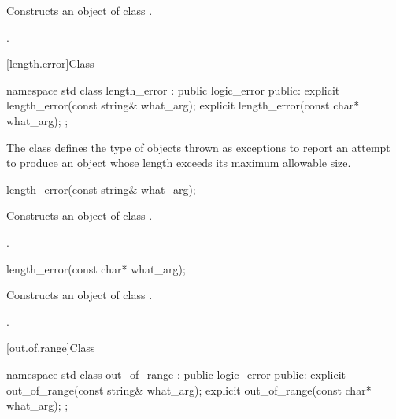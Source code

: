 \begin{itemdescr}
\pnum
\effects
Constructs an object of class
.

\pnum
\postcondition
{}.
\end{itemdescr}

[length.error]{Class }

%
\begin{codeblock}
namespace std {
  class length_error : public logic_error {
  public:
    explicit length_error(const string& what_arg);
    explicit length_error(const char* what_arg);
  };
}
\end{codeblock}

\pnum
The class
defines the type of objects thrown as exceptions
to report an attempt to produce
an object whose length exceeds its maximum allowable size.

%
\begin{itemdecl}
length_error(const string& what_arg);
\end{itemdecl}

\begin{itemdescr}
\pnum
\effects
Constructs an object of class
.

\pnum
\postcondition
{}.
\end{itemdescr}

%
\begin{itemdecl}
length_error(const char* what_arg);
\end{itemdecl}

\begin{itemdescr}
\pnum
\effects
Constructs an object of class
.

\pnum
\postcondition
{}.
\end{itemdescr}

[out.of.range]{Class }

%
\begin{codeblock}
namespace std {
  class out_of_range : public logic_error {
  public:
    explicit out_of_range(const string& what_arg);
    explicit out_of_range(const char* what_arg);
  };
}
\end{codeblock}

